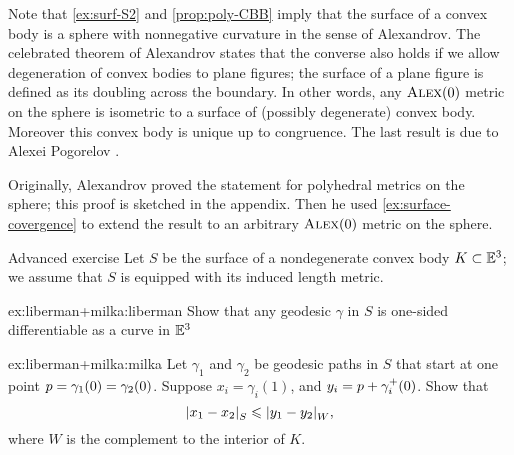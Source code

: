 Note that \ref{ex:surf-S2} and \ref{prop:poly-CBB} imply that the surface of a convex body is a sphere with nonnegative curvature in the sense of Alexandrov.
The celebrated theorem of Alexandrov states that the converse also holds if we allow degeneration of convex bodies to plane figures;
the surface of a plane figure is defined as its doubling across the boundary.
In other words, any $\textsc{Alex}(0)$ metric on the sphere is isometric to a surface of (possibly degenerate) convex body.
Moreover this convex body is unique up to congruence.
The last result is due to Alexei Pogorelov \cite{pogorelov}.

Originally, Alexandrov proved the statement for polyhedral metrics on the sphere; this proof is sketched in the appendix.
Then he used \ref{ex:surface-covergence} to extend the result to an arbitrary $\textsc{Alex}(0)$ metric on the sphere.

\begin{thm}{Advanced exercise}\label{ex:liberman+milka}
Let $S$ be the surface of a nondegenerate convex body $K\subset\mathbb{E}^3$;
we assume that $S$ is equipped with its induced length metric.

\begin{subthm}{ex:liberman+milka:liberman}
Show that any geodesic $\gamma$ in $S$ is one-sided differentiable as a curve in $\mathbb{E}^3$ 
\end{subthm}

\begin{subthm}{ex:liberman+milka:milka}
Let $\gamma_1$ and $\gamma_2$ be geodesic paths in $S$ that start at one point $p=\gamma_1(0)=\gamma_2(0)$.
Suppose $x_i=\gamma_i(1)$, and $y_i=p+\gamma_i^+(0)$.
Show that 
\[|{x_1}-{x_2}|_{S}^{{}}\leqslant |{y_1}-{y_2}|_{W}^{{}},\]
where $W$ is the complement to the interior of $K$.
\end{subthm}

\end{thm}

